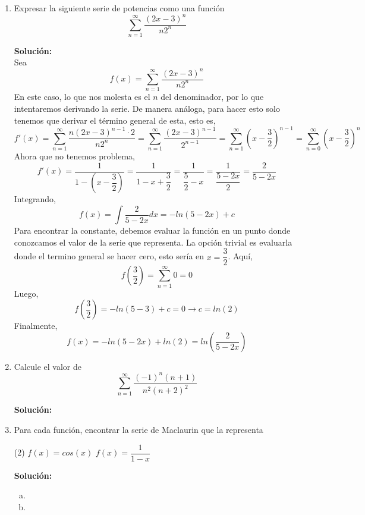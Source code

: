 \documentclass[12pt]{article}
\newenvironment{solucion}
{\begin{mdframed}[backgroundcolor=black!10]
		{\bf Solución:}\\
	}
	{
	\end{mdframed}
}
\newenvironment{preguntas}
{\begin{enumerate}\itemsep12pt
	}
	{
	\end{enumerate}
}
\newcommand{\ra}{\rightarrow}
\begin{document}
\begin{preguntas}
\begin{solucion}
		Finalmente, 
		$$f(x) 
		= \int f'(x) dx
		= \int \sum\limits_{n=0}^{\infty} (-1)^n x^n dx
		= \sum\limits_{n=0}^{\infty} \int (-1)^n x^n dx
		= \sum\limits_{n=0}^{\infty} (-1)^n \dfrac{x^{n+1}}{n+1}$$
\end{solucion}
\item Expresar la siguiente serie de potencias como una función
	$$\sum\limits_{n=1}^\infty \dfrac{(2x-3)^n}{n2^n}$$
\begin{solucion}
Sea 
		$$f(x) = \sum\limits_{n=1}^\infty \dfrac{(2x-3)^n}{n2^n}$$
		En este caso, lo que nos molesta es el $n$ del denominador, por lo que intentaremos derivando la serie. De manera análoga, para hacer esto solo tenemos que derivar el término general de esta, esto es,
		$$f'(x) 
		= \sum\limits_{n=1}^\infty \dfrac{n(2x-3)^{n-1}\cdot 2}{n2^n}
		= \sum\limits_{n=1}^\infty \dfrac{(2x-3)^{n-1}}{2^{n-1}}
		= \sum\limits_{n=1}^\infty \left(x-\dfrac{3}{2}\right)^{n-1}
		= \sum\limits_{n=0}^\infty \left(x-\dfrac{3}{2}\right)^{n}$$
		Ahora que no tenemos problema,
		$$f'(x) 
		= \dfrac{1}{1-\left(x-\dfrac{3}{2}\right)}
		= \dfrac{1}{1-x+\dfrac{3}{2}}
		= \dfrac{1}{\dfrac{5}{2}-x}
		= \dfrac{1}{\dfrac{5-2x}{2}}
		= \dfrac{2}{5-2x}$$
		Integrando,
		$$f(x) 
		= \int \dfrac{2}{5-2x} dx
		= -ln (5-2x) + c$$
		Para encontrar la constante, debemos evaluar la función en un punto donde conozcamos el valor de la serie que representa. La opción trivial es evaluarla donde el termino general se hacer cero, esto sería en $x = \dfrac{3}{2}$. Aquí,
		$$f\left(\dfrac{3}{2}\right) = \sum\limits_{n=1}^\infty 0 = 0$$
		Luego,
		$$f\left(\dfrac{3}{2}\right) = -ln(5-3) + c = 0 \ra c = ln(2)$$
		Finalmente,
		$$f(x) = -ln(5-2x) + ln(2) = ln\left(\dfrac{2}{5-2x}\right)$$
\end{solucion}
\item Calcule el valor de 
	$$\sum\limits_{n=1}^{\infty}\dfrac{(-1)^n(n+1)}{n^2(n+2)^2}$$
\begin{solucion}

\end{solucion}
\item Para cada función, encontrar la serie de Maclaurin que la representa
\begin{tasks}(2)
\task $f(x) = cos(x)$
\task $f(x) = \dfrac{1}{1-x}$
\end{tasks}
\begin{solucion}

\begin{enumerate}[a)]
\item 
\item 
\end{enumerate}
\end{solucion}
\end{preguntas}
\end{document}
